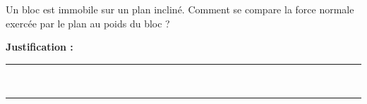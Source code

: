 Un bloc est immobile sur un plan incliné. Comment se compare la force normale exercée par le plan au poids du bloc ?

\choices

\noindent\textbf{Justification :} \hrulefill \\[2.5ex]
\rule{\linewidth}{0.4pt} \\[2.5ex]
\rule{\linewidth}{0.4pt}
\vfill

